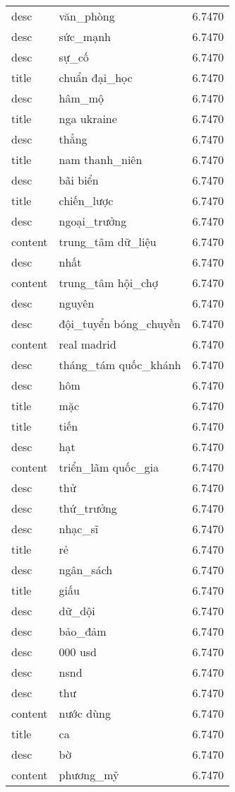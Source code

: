 \documentclass{article}
\begin{document}
\begin{tabular}{lll}
desc & văn\_phòng & 6.7470\\
desc & sức\_mạnh & 6.7470\\
desc & sự\_cố & 6.7470\\
title & chuẩn đại\_học & 6.7470\\
desc & hâm\_mộ & 6.7470\\
title & nga ukraine & 6.7470\\
desc & thẳng & 6.7470\\
title & nam thanh\_niên & 6.7470\\
desc & bãi biển & 6.7470\\
title & chiến\_lược & 6.7470\\
desc & ngoại\_trưởng & 6.7470\\
content & trung\_tâm dữ\_liệu & 6.7470\\
desc & nhất & 6.7470\\
content & trung\_tâm hội\_chợ & 6.7470\\
desc & nguyên & 6.7470\\
desc & đội\_tuyển bóng\_chuyền & 6.7470\\
content & real madrid & 6.7470\\
desc & tháng\_tám quốc\_khánh & 6.7470\\
desc & hôm & 6.7470\\
title & mặc & 6.7470\\
title & tiến & 6.7470\\
desc & hạt & 6.7470\\
content & triển\_lãm quốc\_gia & 6.7470\\
desc & thử & 6.7470\\
desc & thứ\_trưởng & 6.7470\\
desc & nhạc\_sĩ & 6.7470\\
title & rẻ & 6.7470\\
desc & ngân\_sách & 6.7470\\
title & giấu & 6.7470\\
desc & dữ\_dội & 6.7470\\
desc & bảo\_đảm & 6.7470\\
desc & 000 usd & 6.7470\\
desc & nsnd & 6.7470\\
desc & thư & 6.7470\\
content & nước dùng & 6.7470\\
title & ca & 6.7470\\
desc & bờ & 6.7470\\
content & phương\_mỹ & 6.7470\\

\end{tabular}
\end{document}
